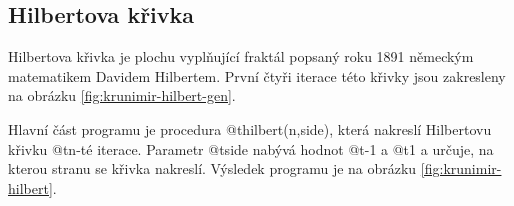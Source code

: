 \subsection{Hilbertova křivka}

Hilbertova křivka je plochu vyplňující fraktál popsaný roku 1891 německým
matematikem Davidem Hilbertem. \cite{wiki:hilbert-curve} První čtyři iterace
této křivky jsou zakresleny na obrázku \ref{fig:krunimir-hilbert-gen}.

Hlavní část programu je procedura @t{hilbert(n,side)}, která nakreslí Hilbertovu
křivku @t{n}-té iterace. Parametr @t{side} nabývá hodnot @t{-1} a @t{1} a
určuje, na kterou stranu se křivka nakreslí. Výsledek programu je na obrázku
\ref{fig:krunimir-hilbert}.



